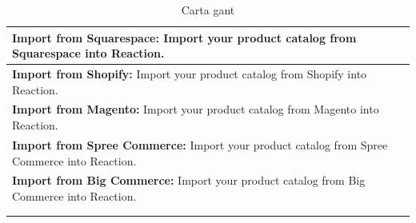 \begin{table}[h!]
\begin{tabular}{ |L{0.6\paperwidth}|L{0.1\paperwidth}|}
\\ \hline
	\textbf{ Import from Squarespace:} Import your product catalog from Squarespace into Reaction.&
	
\\ \hline
	 \textbf{ Import from Shopify:} Import your product catalog from Shopify into Reaction.&
	
\\ \hline
	\textbf{ Import from Magento:} Import your product catalog from Magento into Reaction.&
	
\\ \hline
	\textbf{ Import from Spree Commerce:} Import your product catalog from Spree Commerce into Reaction.&
	
\\ \hline
	\textbf{ Import from Big Commerce:} Import your product catalog from Big Commerce into Reaction.&
	
\\ \hline
	&
	
\\ \hline
	&
				
\\ \hline
\end{tabular}
    \caption{ Carta gant}
    \label{tab:task_proyect}
\end{table}

%
%	
%	
